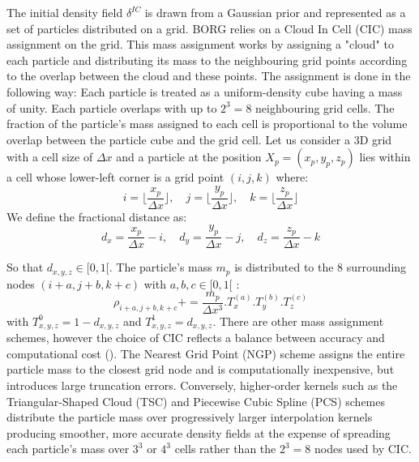 The initial density field $\delta^{IC}$ is drawn from a Gaussian prior and represented as a set of particles distributed on a grid. 
BORG relies on a Cloud In Cell (CIC) mass assignment on the grid. This mass assignment 
works by assigning a "cloud" to each particle and distributing its mass to the neighbouring grid points according to the overlap between the cloud and these points. 
The assignment is done in the following way: Each particle is treated as a uniform-density cube having a mass of unity. Each particle overlaps with up to $2^3=8$ neighbouring grid cells. 
The fraction of the particle's mass assigned to each cell is proportional to the volume overlap between the particle cube and the grid cell. Let us consider a 3D grid 
with a cell size of $\Delta x$ and a particle at the position $X_p = (x_p, y_p, z_p)$ lies within a cell whose lower-left corner is a grid point $(i, j, k)$ where: 
\begin{equation}
    i = \biggl \lfloor \frac{x_p}{\Delta x} \biggr \rfloor, \quad j = \biggl \lfloor \frac{y_p}{\Delta x} \biggr \rfloor , \quad k = \biggl \lfloor \frac{z_p}{\Delta x} \biggr \rfloor
\end{equation}
We define the fractional distance as:
\begin{equation}
    d_x = \frac{x_p}{\Delta x} - i, \quad d_y = \frac{y_p}{\Delta x} - j, \quad d_z = \frac{z_p}{\Delta x} - k
\end{equation} 

So that $d_{x, y, z} \in [0,1[$. The particle's mass $m_p$ is distributed to the 8 surrounding nodes $(i+a, j+b, k+c)$ with $a,b,c \in [0,1[$ : 
\begin{equation}
    \rho_{i+a, j+b, k+c} += \frac{m_p}{\Delta x ^ 3} . T_x ^{(a)} . T_y ^{(b)} . T_z ^{(c)}
\end{equation}
with $T_{x, y, z}^{0} = 1 - d_{x, y, z}$ and $T_{x, y, z}^{1} = d_{x, y, z}$. 
There are other mass assignment schemes, however the choice of CIC reflects a balance between accuracy and computational cost (\cite{Hockney_1988}). 
The Nearest Grid Point (NGP) scheme assigns the entire particle mass to the closest grid node and is computationally inexpensive, but introduces large truncation errors. 
Conversely, higher-order kernels such as the Triangular-Shaped Cloud (TSC) and Piecewise Cubic Spline (PCS) schemes distribute the particle mass over progressively 
larger interpolation kernels producing smoother, more accurate density fields at the expense 
of spreading each particle's mass over $3^3$ or $4^3$ cells rather than the $2^3 = 8$ nodes used by CIC. \\

